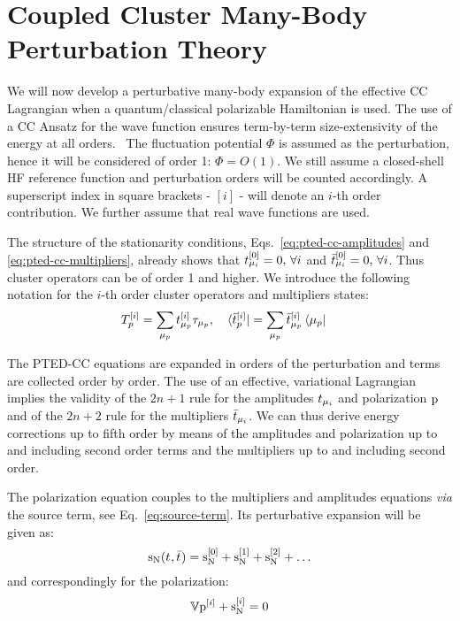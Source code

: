 \section[Coupled Cluster Many-Body Perturbation Theory]{
Coupled Cluster Many-Body Perturbation Theory}\label{sec:mbpt-polarizable}

We will now develop a perturbative many-body expansion of the effective
\acrshort{CC} Lagrangian when a quantum/classical polarizable Hamiltonian is
used.
The use of a \acrshort{CC} Ansatz for the wave function ensures term-by-term
size-extensivity of the energy at all orders.~\autocite{Helgaker2000-tz}
The fluctuation potential $\Phi$ is assumed as the perturbation, hence
it will be considered of order 1: $\Phi = O(1)$.
We still assume a closed-shell \acrshort{HF} reference function and
perturbation orders will be counted accordingly.
A superscript index in square brackets - $[i]$ -  will denote an $i$-th
order contribution.
We further assume that real wave functions are used.

The structure of the stationarity conditions,
Eqs.~\eqref{eq:pted-cc-amplitudes} and \eqref{eq:pted-cc-multipliers},
already shows that $t_{\mu_i}^{[0]} = 0, \,\forall i$ and
$\bar{t}_{\mu_i}^{[0]} = 0, \, \forall i$.
Thus cluster operators can be of order 1 and higher. We introduce the
following notation for the $i$-th order cluster operators and
multipliers states:
\begin{alignat}{2}
  T_p^{[i]} = \sum_{\mu_p}t_{\mu_p}^{[i]}\tau_{\mu_p},
  \quad&
  \bra{\bar{t}_{p}^{[i]}} = \sum_{\mu_p}\bar{t}_{\mu_p}^{[i]}\bra{\mu_p}
\end{alignat}

The \acrshort{PTED}-\acrshort{CC} equations are expanded in orders of the
perturbation and terms are collected order by order. The use of an
effective, variational Lagrangian implies the validity of the $2n+1$
rule for the amplitudes $t_{\mu_i}$ and polarization $\mathrm{p}$ and of the
$2n+2$ rule for the multipliers $\bar{t}_{\mu_i}$.
We can thus derive energy corrections up to fifth order by means of the
amplitudes and polarization up to and including second order terms and
the multipliers up to and including second order.

The polarization equation couples to the multipliers and amplitudes
equations \emph{via} the source term, see Eq.~\eqref{eq:source-term}.
Its perturbative expansion will be given as:
\begin{equation}\label{eq:source-term-pt}
  \mathrm{s}_{\mathrm{N}}(t_{},\bar{t}_{}) =
  \mathrm{s}_{\mathrm{N}}^{[0]}
  + \mathrm{s}_{\mathrm{N}}^{[1]}
  + \mathrm{s}_{\mathrm{N}}^{[2]}
  + \ldots
\end{equation}
and correspondingly for the polarization:
\begin{equation}\label{eq:pol-eq-pt}
  \mathbb{V}\mathrm{p}^{[i]} + \mathrm{s}_{\mathrm{N}}^{[i]} = 0
\end{equation}

